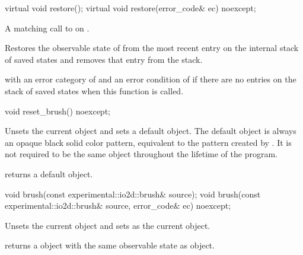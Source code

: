\begin{itemdecl}
virtual void restore();
virtual void restore(error_code& ec) noexcept;
\end{itemdecl}
\begin{itemdescr}
	\pnum
	\requires
	A matching call to  on .
	
	\pnum
	\effects
	Restores the observable state of  from the most recent entry on the internal stack of saved states and removes that entry from the stack.
	
	\pnum
	\throws
	 with an error category of  and an error condition of  if there are no entries on the stack of saved states when this function is called.
\end{itemdescr}

\begin{itemdecl}
void reset_brush() noexcept;
\end{itemdecl}
\begin{itemdescr}
	\pnum
	\effects
	Unsets the current  object and sets a default  object.
	\enternote
	The default  object is always an opaque black solid color 
	pattern, equivalent to the pattern created by 
	. It is 
	not required to be the same object throughout the lifetime of the program.
	\exitnote
	
	\pnum
	\postconditions
	 returns a default  object.
\end{itemdescr}

\begin{itemdecl}
void brush(const experimental::io2d::brush& source);
void brush(const experimental::io2d::brush& source,
  error_code& ec) noexcept;
\end{itemdecl}
\begin{itemdescr}
	\pnum
	\effects
	Unsets the current  object and sets  as the current  object.
	
	\pnum
	\postconditions
	 returns a  object with the same observable state as  object.
\end{itemdescr}

